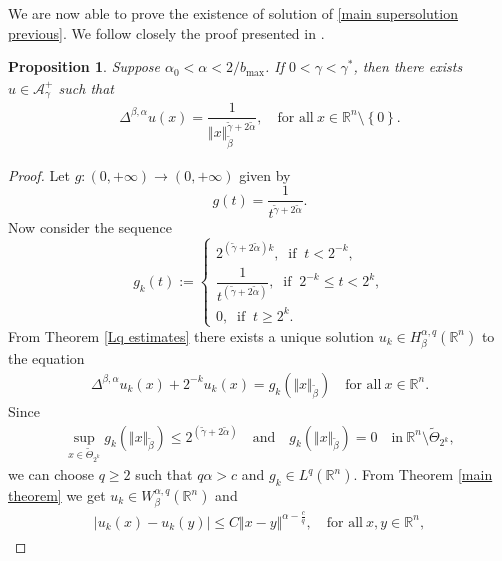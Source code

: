 \documentclass[10pt, leqno]{article}
\newtheorem{proposition}[theorem]{Proposition}
\theoremstyle{definition}
\theoremstyle{remark}
\numberwithin{equation}{section}
\begin{document}
We are now able to prove the existence of solution of \eqref{main supersolution previous}. We follow closely the proof presented in \cite{CWW}.
\begin{proposition}
\label{main supersolution prop}
Suppose $ \alpha_{0} < \alpha < 2/b_{\max}$. If $0 < \gamma < \gamma_{}^{\ast}$, then there exists $u \in \mathcal{A}_{\gamma}^{+}$ such that
\begin{eqnarray}
\label{main supersolution}
\Delta^{\beta, \alpha} u (x) = \dfrac{1}{\Vert x \Vert_{\tilde{\beta}}^{\tilde{\gamma} + 2\tilde{\alpha}}}, \quad \text{for all} \ x \in \mathbb{R}^{n} \setminus \left\lbrace 0 \right\rbrace.
\end{eqnarray}
\end{proposition}
\begin{proof}
Let $g: \left(0, +\infty \right) \rightarrow \left(0, +\infty \right)$ given by
$$
g(t) = \dfrac{1}{t^{\tilde{\gamma} + 2 \tilde{\alpha}}}.
$$
Now consider the sequence
$$
g_{k}(t):= \left \{
\begin{array}{ll}
2^{\left(\tilde{\gamma} + 2 \tilde{\alpha} \right)k}, \ \text{ if } \ t < 2^{-k}, \\
\dfrac{1}{t^{\left(\tilde{\gamma} + 2 \tilde{\alpha} \right)}}, \ \text{ if } \ 2^{-k} \leq t < 2^{k}, \\
0, \ \text{ if } \  t \geq 2^{k}.
\end{array}
\right.
$$
From Theorem \ref{Lq estimates} there exists a unique solution $u_{k} \in  H^{\alpha, q}_{\beta}\left ( \mathbb{R}^{n} \right)$ to the equation
\begin{eqnarray}
\Delta^{\beta, \alpha}u_{k}(x) + 2^{-k}u_{k}(x) = g_{k}\left(\Vert x \Vert^{}_{\tilde{\beta}}\right) \quad \text{for all} \ x \in \mathbb{R}^{n}.
\end{eqnarray}
Since
\begin{eqnarray}
\sup_{x \in \tilde{\Theta}_{2^{k}}}g_{k}\left(\Vert x \Vert^{}_{\tilde{\beta}}\right) \leq 2^{\left(\tilde{\gamma} + 2 \tilde{\alpha} \right)} \quad \text{and} \quad g_{k}\left(\Vert x \Vert^{}_{\tilde{\beta}}\right) = 0 \quad \text{in} \ \mathbb{R}^{n} \setminus \tilde{\Theta}_{2^{k}},
\end{eqnarray}
we can choose $q \geq 2$ such that $q \alpha > c$ and $g_{k} \in L^{q}(\mathbb{R}^{n})$. From Theorem \ref{main theorem} we get $u_{k} \in W_{\beta}^{\alpha, q}(\mathbb{R}^{n})$ and
\begin{eqnarray}
\vert u_{k}(x) - u_{k}(y) \vert \leq C \Vert x - y \Vert^{\alpha - \frac{c}{q}}_{}, \quad \text{for all} \ x,y \in \mathbb{R}^{n},

\end{eqnarray}
\end{proof}
\end{document}

